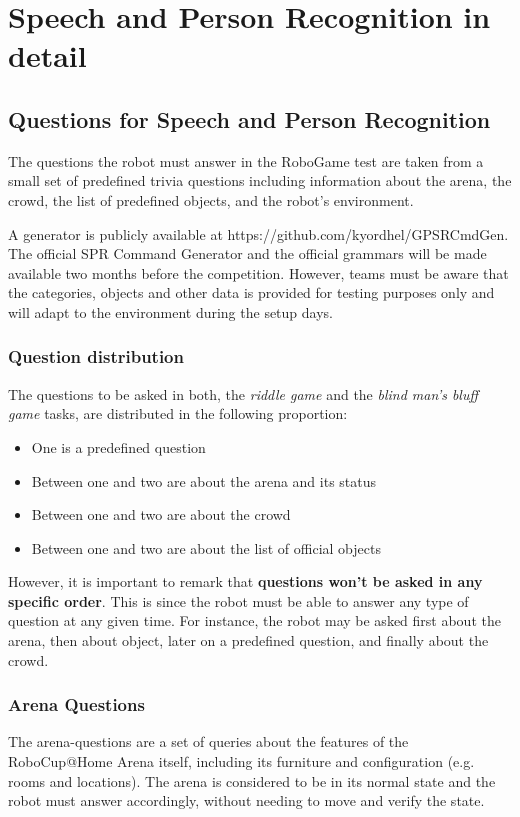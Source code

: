 \chapter{Speech and Person Recognition in detail}
\label{chap:robogame-appendix}

\section{Questions for Speech and Person Recognition}
The questions the robot must answer in the RoboGame test are taken from a small set of predefined trivia questions including information about the arena, the crowd, the list of predefined objects, and the robot's environment.

A generator is publicly available at https://github.com/kyordhel/GPSRCmdGen. The official SPR Command Generator and the official grammars will be made available two months before the competition. However, teams must be aware that the categories, objects and other data is provided for testing purposes only and will adapt to the environment during the setup days.

\subsection{Question distribution}
The questions to be asked in both, the \textit{riddle game} and the \textit{blind man's bluff game} tasks, are distributed in the following proportion:
\begin{itemize}
    \item One is a predefined question
    \item Between one and two are about the arena and its status
    \item Between one and two are about the crowd
    \item Between one and two are about the list of official objects
\end{itemize}
However, it is important to remark that \textbf{questions won't be asked in any specific order}. This is since the robot must be able to answer any type of question at any given time. For instance, the robot may be asked first about the arena, then about object, later on a predefined question, and finally about the crowd.

\subsection{Arena Questions}
The arena-questions are a set of queries about the features of the RoboCup@Home Arena itself, including its furniture and configuration (e.g. rooms and locations). The arena is considered to be in its normal state and the robot must answer accordingly, without needing to move and verify the state.

